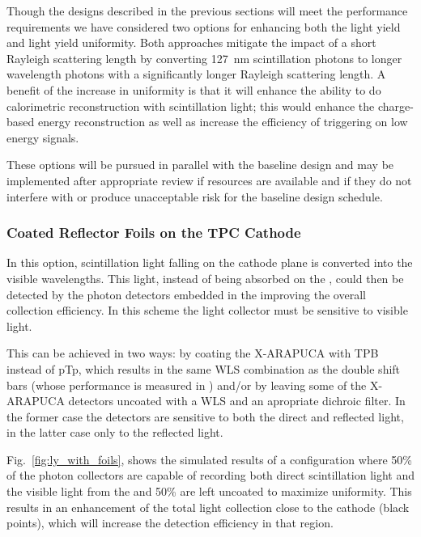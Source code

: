 Though the designs described in the previous sections will meet the  performance requirements we have considered two options for enhancing both the light yield and light yield uniformity.  Both approaches mitigate the impact of a short Rayleigh scattering length by converting \SI{127}{nm} scintillation photons to longer wavelength photons with a significantly longer Rayleigh scattering length. A benefit of the increase in uniformity is that it will enhance the ability to do calorimetric reconstruction with scintillation light; this would enhance the charge-based energy reconstruction as well as increase the efficiency of triggering on low energy signals.

These options will be pursued in parallel with the baseline design and may be implemented after appropriate review if resources are available and if they do not interfere with or produce unacceptable risk for the baseline design schedule.



\subsubsection{Coated Reflector Foils on the TPC Cathode}
\label{sec:fdsp-pd-enh-cathode}

In this option, scintillation light falling on the cathode plane is converted into the visible wavelengths. This light, instead of being absorbed on the , could then be detected by the photon detectors embedded in the  improving the overall collection efficiency. In this scheme the light collector must be sensitive to visible light. 

This can be achieved in two ways: by coating the X-ARAPUCA with TPB instead of pTp, which results in the same WLS combination as the double shift bars (whose performance is measured in )
and/or by leaving some of the X-ARAPUCA detectors uncoated with a WLS and an apropriate dichroic filter. In the former case the detectors are sensitive to both the direct and reflected light, in the latter case only to the reflected light. 

Fig.~\ref{fig:ly_with_foils}, shows the simulated results of a configuration where 50\% of the  photon collectors are capable of recording both direct scintillation light and the visible light from the  and 50\% are left uncoated to maximize uniformity. This results in an enhancement of the total light collection close to the cathode (black points), which will increase the detection efficiency in that region. 


